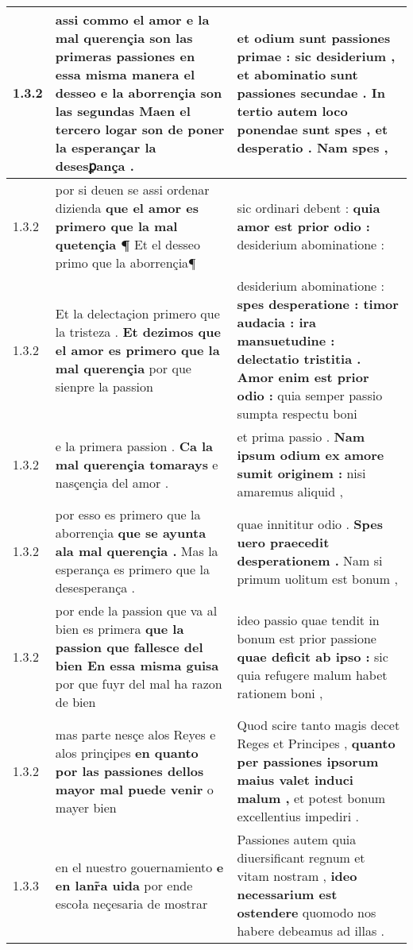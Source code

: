 \begin{tabular}{|p{1cm}|p{6.5cm}|p{6.5cm}|}
1.3.2 & assi commo el amor e la mal querençia son las primeras passiones \textbf{ en essa misma manera el desseo e la aborrençia son las segundas } Maen el tercero logar son de poner la esperançar la desesꝑança . & et odium sunt passiones primae : \textbf{ sic desiderium , } et abominatio sunt passiones secundae . In tertio autem loco ponendae sunt spes , et desperatio . Nam spes , \\\hline
1.3.2 & por si deuen se assi ordenar dizienda \textbf{ que el amor es primero que la mal quetençia ¶ } Et el desseo primo que la aborrençia¶ & sic ordinari debent : \textbf{ quia amor est prior odio : } desiderium abominatione : \\\hline
1.3.2 & Et la delectaçion primero que la tristeza . \textbf{ Et dezimos que el amor es primero que la mal querençia } por que sienpre la passion & desiderium abominatione : \textbf{ spes desperatione : timor audacia : ira mansuetudine : delectatio tristitia . Amor enim est prior odio : } quia semper passio sumpta respectu boni \\\hline
1.3.2 & e la primera passion . \textbf{ Ca la mal querençia tomarays } e nasçençia del amor . & et prima passio . \textbf{ Nam ipsum odium ex amore sumit originem : } nisi amaremus aliquid , \\\hline
1.3.2 & por esso es primero que la aborrençia \textbf{ que se ayunta ala mal querençia . } Mas la esperança es primero que la desesperança . & quae innititur odio . \textbf{ Spes uero praecedit desperationem . } Nam si primum uolitum est bonum , \\\hline
1.3.2 & por ende la passion que va al bien es primera \textbf{ que la passion que fallesce del bien En essa misma guisa } por que fuyr del mal ha razon de bien & ideo passio quae tendit in bonum est prior passione \textbf{ quae deficit ab ipso : } sic quia refugere malum habet rationem boni , \\\hline
1.3.2 & mas parte nesçe alos Reyes e alos prinçipes \textbf{ en quanto por las passiones dellos mayor mal puede venir } o mayer bien & Quod scire tanto magis decet Reges et Principes , \textbf{ quanto per passiones ipsorum maius valet induci malum , } et potest bonum excellentius impediri . \\\hline
1.3.3 & en el nuestro gouernamiento \textbf{ e en lanr̃a uida } por ende escoła neçesaria de mostrar & Passiones autem quia diuersificant regnum et vitam nostram , \textbf{ ideo necessarium est ostendere } quomodo nos habere debeamus ad illas . \\\hline

\end{tabular}
